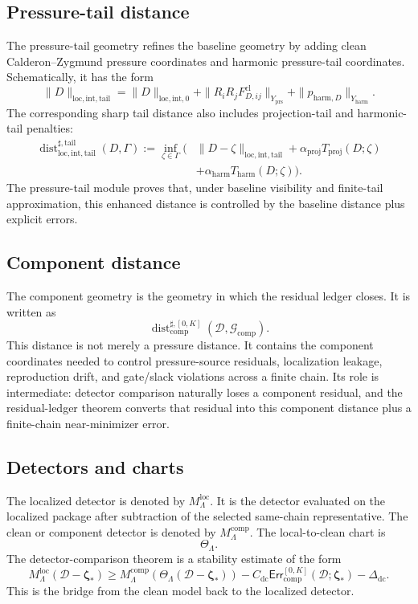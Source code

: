 \documentclass[11pt]{article}
\numberwithin{equation}{section}
\theoremstyle{definition}
\theoremstyle{remark}
\newcommand{\loc}{\mathrm{loc}}
\newcommand{\intg}{\mathrm{int}}
\newcommand{\tail}{\mathrm{tail}}
\newcommand{\prs}{\mathrm{prs}}
\newcommand{\proj}{\mathrm{proj}}
\newcommand{\harm}{\mathrm{harm}}
\newcommand{\cl}{\mathrm{cl}}
\newcommand{\comp}{\mathrm{comp}}
\newcommand{\Err}{\mathsf{Err}}
\newcommand{\Dist}{\operatorname{dist}}
\newcommand{\calD}{\mathcal D}
\newcommand{\calG}{\mathcal G}
\newcommand{\bzeta}{\boldsymbol\zeta}
\begin{document}
\subsection*{Pressure-tail distance}

The pressure-tail geometry refines the baseline geometry by adding clean Calderon--Zygmund pressure coordinates and harmonic pressure-tail coordinates.  Schematically, it has the form
\[
        \|D\|_{\loc,\intg,\tail}
        =
        \|D\|_{\loc,\intg,0}
        +
        \|R_iR_jF^{\cl}_{D,ij}\|_{Y_{\prs}}
        +
        \|p_{\harm,D}\|_{Y_{\harm}}.
\]
The corresponding sharp tail distance also includes projection-tail and harmonic-tail penalties:
\[
\begin{aligned}
        \Dist^{\sharp,\tail}_{\loc,\intg,\tail}(D,\Gamma)
        :=
        \inf_{\zeta\in\Gamma}
        \bigl(&\|D-\zeta\|_{\loc,\intg,\tail}
        +\alpha_{\proj}T_{\proj}(D;\zeta)\\
        &+\alpha_{\harm}T_{\harm}(D;\zeta)\bigr).
\end{aligned}
\]
The pressure-tail module proves that, under baseline visibility and finite-tail approximation, this enhanced distance is controlled by the baseline distance plus explicit errors.

\subsection*{Component distance}

The component geometry is the geometry in which the residual ledger closes.  It is written as
\[
        \Dist_{\comp}^{\sharp,[0,K]}(\calD,\calG_{\comp}).
\]
This distance is not merely a pressure distance.  It contains the component coordinates needed to control pressure-source residuals, localization leakage, reproduction drift, and gate/slack violations across a finite chain.  Its role is intermediate: detector comparison naturally loses a component residual, and the residual-ledger theorem converts that residual into this component distance plus a finite-chain near-minimizer error.

\subsection*{Detectors and charts}

The localized detector is denoted by \(M_\Lambda^{\loc}\).  It is the detector evaluated on the localized package after subtraction of the selected same-chain representative.  The clean or component detector is denoted by \(M_\Lambda^{\comp}\).  The local-to-clean chart is
\[
        \Theta_\Lambda.
\]
The detector-comparison theorem is a stability estimate of the form
\[
        M_\Lambda^{\loc}(\calD-\bzeta_*)
        \ge
        M_\Lambda^{\comp}(\Theta_\Lambda(\calD-\bzeta_*))
        -C_{\mathrm{dc}}\Err_{\comp}^{[0,K]}(\calD;\bzeta_*)
        -\Delta_{\mathrm{dc}}.
\]
This is the bridge from the clean model back to the localized detector.
\end{document}
